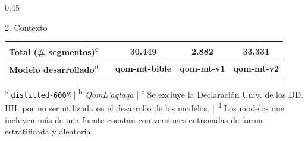 \documentclass[final]{beamer}
\begin{document}
\begin{frame}[t]
\begin{columns}[t,onlytextwidth]
\begin{column}{0.45\textwidth}
\begin{pblock}{2. Contexto}
\begin{center}
\begin{tabular}{lrccc}
      \textbf{Total (\# segmentos)\textsuperscript{c}} &        & \textbf{30.449}
        & \textbf{2.882} & \textbf{33.331} \\
      \midrule
      \textbf{Modelo desarrollado\textsuperscript{d}} &        & \textbf{qom-mt-bible}
        & \textbf{qom-mt-v1} & \textbf{qom-mt-v2} \\
      \bottomrule
    \end{tabular}
    \end{center}
    \vspace{0.2cm}
    {\small \textsuperscript{a} \texttt{distilled-600M} | \textsuperscript{b} \textit{QomL'aqtaqa} | \textsuperscript{c} Se excluye la Declaración Univ. de los DD. HH. por no ser utilizada en el desarrollo de los modelos. | \textsuperscript{d} Los modelos que incluyen más de una fuente cuentan con versiones entrenadas de forma estratificada y aleatoria.}
  \end{pblock}


\end{column}
\end{columns}
\end{frame}
\end{document}
